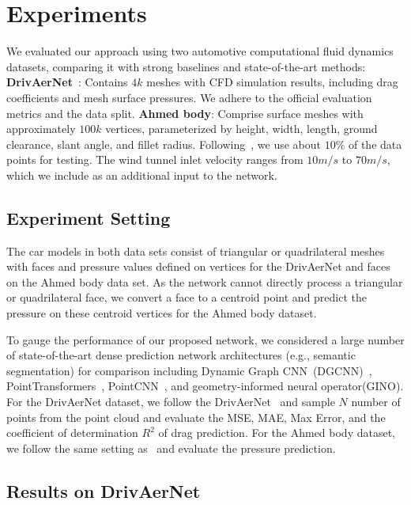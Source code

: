 \section{Experiments}



We evaluated our approach using two automotive computational fluid dynamics datasets, comparing it with strong baselines and state-of-the-art methods:
\textbf{DrivAerNet}~\citep{elrefaie2024drivaernet}: Contains $4k$ meshes with CFD simulation results, including drag coefficients and mesh surface pressures. We adhere to the official evaluation metrics and the data split.
\textbf{Ahmed body}: Comprise surface meshes with approximately $100k$ vertices, parameterized by height, width, length, ground clearance, slant angle, and fillet radius. Following~\citep{li2023geometry}, we use about $10\%$ of the data points for testing. The wind tunnel inlet velocity ranges from $10m/s$ to $70m/s$, which we include as an additional input to the network.


\subsection{Experiment Setting}

The car models in both data sets consist of triangular or quadrilateral meshes with faces and pressure values defined on vertices for the DrivAerNet and faces on the Ahmed body data set. As the network cannot directly process a triangular or quadrilateral face, we convert a face to a centroid point and predict the pressure on these centroid vertices for the Ahmed body dataset.

To gauge the performance of our proposed network, we considered a large number of state-of-the-art dense prediction network architectures (e.g., semantic segmentation) for comparison including Dynamic Graph CNN~(DGCNN)~\citep{wang2019dynamic}, PointTransformers~\citep{zhao2021point}, PointCNN~\citep{qi2017pointnet,li2018pointcnn}, and geometry-informed neural operator(GINO)\citep{li2023geometry}.
For the DrivAerNet dataset, we follow the DrivAerNet~\citep{elrefaie2024drivaernet} and sample $N$ number of points from the point cloud and evaluate the MSE, MAE, Max Error, and the coefficient of determination $R^2$ of drag prediction. For the Ahmed body dataset, we follow the same setting as~\citep{li2023geometry} and evaluate the pressure prediction.



\subsection{Results on DrivAerNet}

